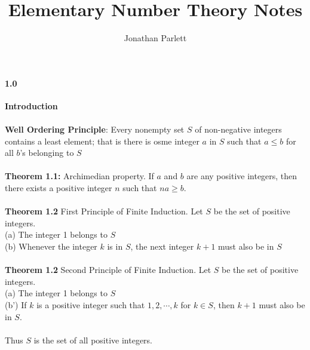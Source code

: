 \documentclass[14pt]{extreport}
\title{Elementary Number Theory Notes}
\author{Jonathan Parlett}
\begin{document}
\paragraph{1.0} \textbf{Introduction}\\\\

\textbf{Well Ordering Principle}: Every nonempty set $S$ of non-negative integers contains a least element; that is there is osme integer $a$ in $S$ such that $a \le b$ for all $b$'s belonging to $S$\\\\

\textbf{Theorem 1.1:} Archimedian property. If $a$ and $b$ are any positive integers, then there exists a positive integer $n$ such that $na \ge b$.\\\\

\textbf{Theorem 1.2} First Principle of Finite Induction. Let $S$ be the set of positive integers.\\
    (a) The integer 1 belongs to $S$\\
    (b) Whenever the integer $k$ is in $S$, the next integer $k+1$ must also be in $S$\\\\

\textbf{Theorem 1.2} Second Principle of Finite Induction. Let $S$ be the set of positive integers.\\
    (a) The integer 1 belongs to $S$\\
    (b') If $k$ is a positive integer such that $1, 2, \cdots ,k$ for $k \in S$, then $k+1$ must also be in $S$.\\\\


    Thus $S$ is the set of all positive integers.\\
\end{document}
